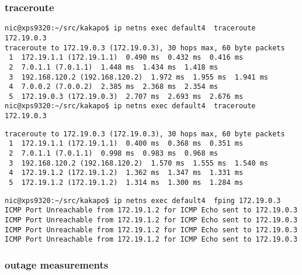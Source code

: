 \subsubsection{traceroute}
\begin{lstlisting}[title=traceroute for normal state\, showing dataplane transit through four virtual routers]
nic@xps9320:~/src/kakapo$ ip netns exec default4  traceroute 172.19.0.3
traceroute to 172.19.0.3 (172.19.0.3), 30 hops max, 60 byte packets
 1  172.19.1.1 (172.19.1.1)  0.490 ms  0.432 ms  0.416 ms
 2  7.0.1.1 (7.0.1.1)  1.448 ms  1.434 ms  1.418 ms
 3  192.168.120.2 (192.168.120.2)  1.972 ms  1.955 ms  1.941 ms
 4  7.0.0.2 (7.0.0.2)  2.385 ms  2.368 ms  2.354 ms
 5  172.19.0.3 (172.19.0.3)  2.707 ms  2.693 ms  2.676 ms
nic@xps9320:~/src/kakapo$ ip netns exec default4  traceroute 172.19.0.3
\end{lstlisting}

\begin{lstlisting}[title=traceroute report when the adverse route is not mitigated]
traceroute to 172.19.0.3 (172.19.0.3), 30 hops max, 60 byte packets
 1  172.19.1.1 (172.19.1.1)  0.400 ms  0.368 ms  0.351 ms
 2  7.0.1.1 (7.0.1.1)  0.998 ms  0.983 ms  0.968 ms
 3  192.168.120.2 (192.168.120.2)  1.570 ms  1.555 ms  1.540 ms
 4  172.19.1.2 (172.19.1.2)  1.362 ms  1.347 ms  1.331 ms
 5  172.19.1.2 (172.19.1.2)  1.314 ms  1.300 ms  1.284 ms
\end{lstlisting}

\begin{lstlisting}
nic@xps9320:~/src/kakapo$ ip netns exec default4  fping 172.19.0.3
ICMP Port Unreachable from 172.19.1.2 for ICMP Echo sent to 172.19.0.3
ICMP Port Unreachable from 172.19.1.2 for ICMP Echo sent to 172.19.0.3
ICMP Port Unreachable from 172.19.1.2 for ICMP Echo sent to 172.19.0.3
ICMP Port Unreachable from 172.19.1.2 for ICMP Echo sent to 172.19.0.3
\end{lstlisting}


\subsubsection{outage measurements}

